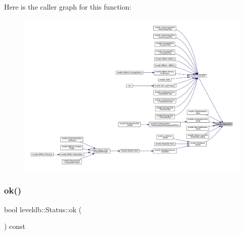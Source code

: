 Here is the caller graph for this function\+:
\nopagebreak
\begin{figure}[H]
\begin{center}
\leavevmode
\includegraphics[width=350pt]{classleveldb_1_1_status_a8e3720d233281c874a53c17e081f51b3_icgraph}
\end{center}
\end{figure}
\mbox{\label{classleveldb_1_1_status_af988e2a8d204019c14f21126d9300362}} 
\subsubsection{\texorpdfstring{ok()}{ok()}}
{\footnotesize\ttfamily bool leveldb\+::\+Status\+::ok (\begin{DoxyParamCaption}{ }\end{DoxyParamCaption}) const\hspace{0.3cm}{\ttfamily [inline]}}

